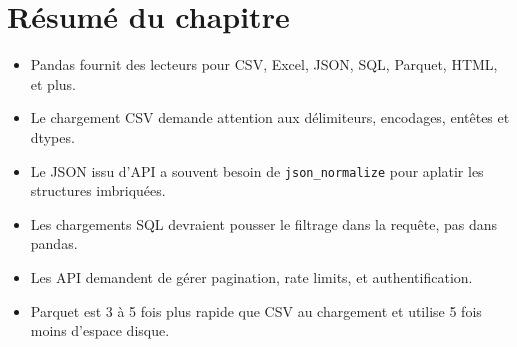 \section{R\'esum\'e du chapitre}

\begin{itemize}
  \item Pandas fournit des lecteurs pour CSV, Excel, JSON, SQL, Parquet, HTML, et plus.
  \item Le chargement CSV demande attention aux d\'elimiteurs, encodages, ent\^etes et dtypes.
  \item Le JSON issu d'API a souvent besoin de \texttt{json\_normalize} pour aplatir les structures imbriqu\'ees.
  \item Les chargements SQL devraient pousser le filtrage dans la requ\^ete, pas dans pandas.
  \item Les API demandent de g\'erer pagination, rate limits, et authentification.
  \item Parquet est 3 \`a 5 fois plus rapide que CSV au chargement et utilise 5 fois moins d'espace disque.
\end{itemize}
